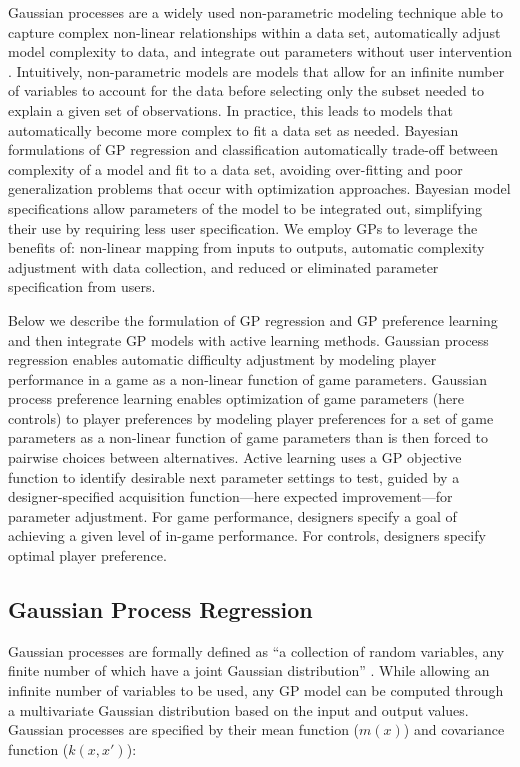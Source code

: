 \documentclass[letterpaper]{article}
\begin{document}
Gaussian processes are a widely used non-parametric modeling technique able to capture complex non-linear relationships within a data set, automatically adjust model complexity to data, and integrate out parameters without user intervention \cite{rasmussen2006}. Intuitively, non-parametric models are models that allow for an infinite number of variables to account for the data before selecting only the subset needed to explain a given set of observations. In practice, this leads to models that automatically become more complex to fit a data set as needed. Bayesian formulations of GP regression and classification automatically trade-off between complexity of a model and fit to a data set, avoiding over-fitting and poor generalization problems that occur with optimization approaches. Bayesian model specifications allow parameters of the model to be integrated out, simplifying their use by requiring less user specification. We employ GPs to leverage the benefits of: non-linear mapping from inputs to outputs, automatic complexity adjustment with data collection, and reduced or eliminated parameter specification from users.

Below we describe the formulation of GP regression and GP preference learning and then integrate GP models with active learning methods. Gaussian process regression enables automatic difficulty adjustment by modeling player performance in a game as a non-linear function of game parameters. Gaussian process preference learning enables optimization of game parameters (here controls) to player preferences by modeling player preferences for a set of game parameters as a non-linear function of game parameters than is then forced to pairwise choices between alternatives. Active learning uses a GP objective function to identify desirable next parameter settings to test, guided by a designer-specified acquisition function---here expected improvement---for parameter adjustment. For game performance, designers specify a goal of achieving a given level of in-game performance. For controls, designers specify optimal player preference.

\subsection{Gaussian Process Regression}
Gaussian processes are formally defined as ``a collection of random variables, any finite number of which have a joint Gaussian distribution'' \cite{rasmussen2006}. While allowing an infinite number of variables to be used, any GP model can be computed through a multivariate Gaussian distribution based on the input and output values. Gaussian processes are specified by their mean function ($m(x)$) and covariance function ($k(x,x')$):
\end{document}
